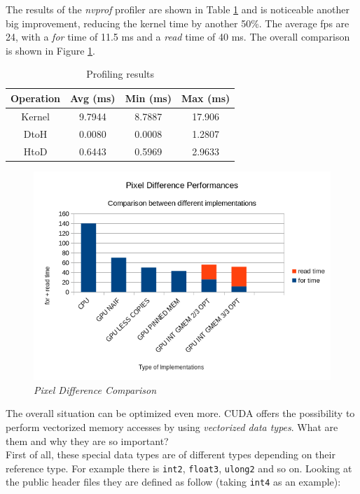 \documentclass[paper=a4, fontsize=10pt]{scrartcl}	%
\begin{document}
	The results of the \textit{nvprof} profiler are shown in Table \ref{tab:nvprof_naif5} and is noticeable another big improvement, reducing the kernel time by another 50\%. The average fps are 24, with a \textit{for} time of 11.5 ms and a \textit{read} time of 40 ms. The overall comparison is shown in Figure \ref{fig:chart5}.

	\begin{table}[H]
		\centering
		\begin{tabular}{||c | c c c||} 
			\hline
			Operation & Avg (ms) & Min (ms) & Max (ms) \\ [0.5ex] 
			\hline\hline
			Kernel & 9.7944 & 8.7887 & 17.906 \\ 
			\hdashline
			DtoH & 0.0080 & 0.0008 & 1.2807 \\
			\hdashline
			HtoD & 0.6443 & 0.5969 & 2.9633 \\
			\hline
		\end{tabular}
		\caption{Profiling results}
		\label{tab:nvprof_naif5}
	\end{table}

	\begin{figure}[H]
		\centering
		\includegraphics[width=0.9\linewidth]{images/chart5.png}
		\caption{\textit{Pixel Difference Comparison}}
		\label{fig:chart5}
	\end{figure}

	The overall situation can be optimized even more. CUDA offers the possibility to perform vectorized memory accesses by using \textit{vectorized data types}. What are them and why they are so important?\\

	First of all, these special data types are of different types depending on their reference type. For example there is \texttt{int2}, \texttt{float3}, \texttt{ulong2} and so on. Looking at the public header files they are defined as follow (taking \texttt{int4} as an example):
\end{document}
